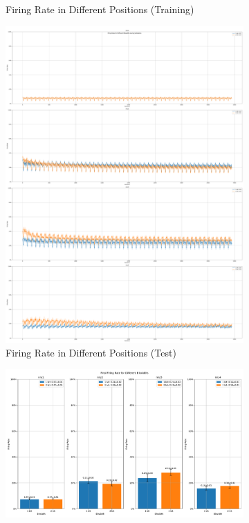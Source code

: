 \begin{figure}[H]
\begin{subfigure}[H]{0.48\textwidth}
                \caption{Firing Rate in Different Positions (Training)}
            \end{subfigure}
            \hfill
            \begin{subfigure}[H]{0.48\textwidth}
                \centering
                \includegraphics[width=\textwidth]{../firerate/NMNIST/plots/nmnist_test_firerate.pdf}
                \caption{Firing Rate in Different Positions (Test)}
            \end{subfigure}
            \hfill
            \begin{subfigure}[H]{\textwidth}
                \centering
                \includegraphics[width=\textwidth]{../firerate/NMNIST/plots/nmnist_final_firerate.pdf}

\end{subfigure}
\end{figure}
